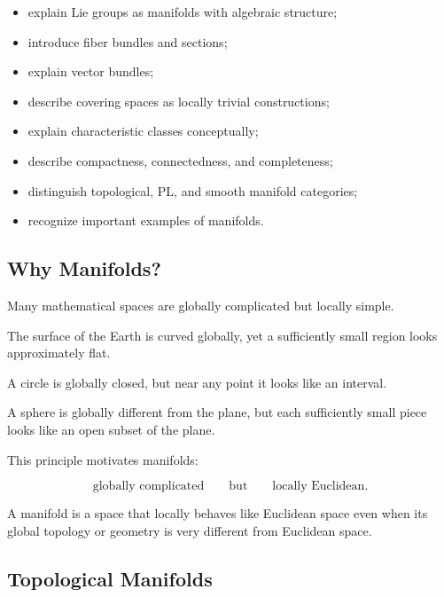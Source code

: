 {\begin{itemize}
    \item explain Lie groups as manifolds with algebraic structure;
    \item introduce fiber bundles and sections;
    \item explain vector bundles;
    \item describe covering spaces as locally trivial constructions;
    \item explain characteristic classes conceptually;
    \item describe compactness, connectedness, and completeness;
    \item distinguish topological, PL, and smooth manifold categories;
    \item recognize important examples of manifolds.
\end{itemize}
}

\subsection{Why Manifolds?}
\label{subsec:why-manifolds}

Many mathematical spaces are globally complicated but locally simple.

The surface of the Earth is curved globally, yet a sufficiently small region
looks approximately flat.

A circle is globally closed, but near any point it looks like an interval.

A sphere is globally different from the plane, but each sufficiently small
piece looks like an open subset of the plane.

This principle motivates manifolds:

\[
\boxed{
\text{globally complicated}
\qquad
\text{but}
\qquad
\text{locally Euclidean}.
}
\]

\begin{conceptbox}
A manifold is a space that locally behaves like Euclidean space even when
its global topology or geometry is very different from Euclidean space.
\end{conceptbox}

\subsection{Topological Manifolds}
\label{subsec:topological-manifolds}

